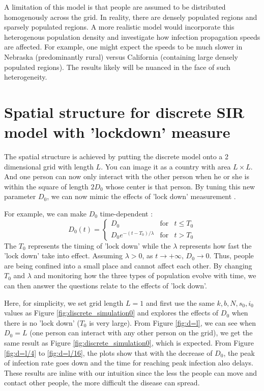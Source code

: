 \documentclass[12pt, reqno]{amsart}
\begin{document}
    A limitation of this model is that people are assumed to be distributed homogenously across the grid. In reality, there are densely populated regions and sparsely populated regions. A more realistic model would incorporate this heterogenous population density and investigate how infection propagation speeds are affected. For example, one might expect the speeds to be much slower in Nebraska (predominantly rural) versus California (containing large densely populated regions). The results likely will be nuanced in the face of such heterogeneity.
    
    \newpage 

    \section{Spatial structure for discrete SIR model with 'lockdown' measure} \label{appendix:sirs_discrete}
    The spatial structure is achieved by putting the discrete model onto a 2 dimensional grid with length $L$. You can image it as a country with area $L \times L$. And one person can now only interact with the other person when he or she is within the square of length $2D_0$ whose center is that person. By tuning this new parameter $D_0$, we can now mimic the effects of 'lock down' measurement \cite{kaxiras2020multiple}.

    For example, we can make $D_0$ time-dependent \cite{kaxiras2020multiple}:
    \begin{equation}
    \label{D0}
    D_{0}(t)=\left\{ \begin{array}{lcl}
    D_0 & \mbox{for}
    & t \leq T_0  \\
    D_{0}e^{-(t - T_0)/\lambda} & \mbox{for} & t > T_0
    \end{array}\right.
    \end{equation}
    The $T_0$ represents the timing of 'lock down' while the $\lambda$ represents how fast the 'lock down' take into effect. Assuming $\lambda > 0$, as $t \to +\infty$, $D_0 \to 0$. Thus, people are being confined into a small place and cannot affect each other. By changing $T_0$ and $\lambda$ and monitoring how the three types of population evolve with time, we can then answer the questions relate to the effects of 'lock down'.
    
    Here, for simplicity, we set grid length $L = 1$ and first use the same $k, b, N, s_0, i_0$ values as Figure \ref{fig:discrete_simulation0} and explores the effects of $D_0$ when there is no 'lock down' ($T_0$ is very large). From Figure \ref{fig:d=l}, we can see when $D_0 = L$ (one person can interact with any other person on the grid), we get the same result as Figure \ref{fig:discrete_simulation0}, which is expected. From Figure \ref{fig:d=l/4} to \ref{fig:d=l/16}, the plots show that with the decrease of $D_0$, the peak of infection rate goes down and the time for reaching peak infection also delays. These results are inline with our intuition since the less the people can move and contact other people, the more difficult the disease can spread.
    
\end{document}
